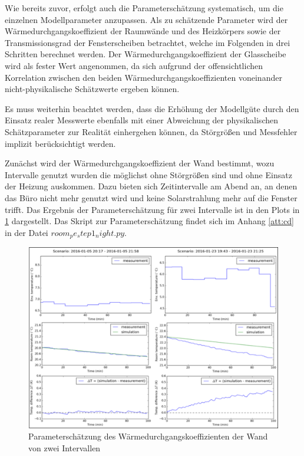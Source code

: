 Wie bereits zuvor, erfolgt auch die Parameterschätzung systematisch, um die einzelnen Modellparameter anzupassen. Als zu schätzende Parameter wird der Wärmedurchgangskoeffizient der Raumwände und des Heizkörpers sowie der Transmissionsgrad der Fensterscheiben betrachtet, welche im Folgenden in drei Schritten berechnet werden. Der Wärmedurchgangskoeffizient der Glasscheibe wird als fester Wert angenommen, da sich aufgrund der offensichtlichen Korrelation zwischen den beiden Wärmedurchgangskoeffizienten voneinander nicht-physikalische Schätzwerte ergeben können.

Es muss weiterhin beachtet werden, dass die Erhöhung der Modellgüte durch den Einsatz realer Messwerte ebenfalls mit einer Abweichung der physikalischen Schätzparameter zur Realität einhergehen können, da Störgrößen und Messfehler implizit berücksichtigt werden.

Zunächst wird der Wärmedurchgangskoeffizient der Wand bestimmt, wozu Intervalle genutzt wurden die möglichst ohne Störgrößen sind und ohne Einsatz der Heizung auskommen. Dazu bieten sich Zeitintervalle am Abend an, an denen das Büro nicht mehr genutzt wird und keine Solarstrahlung mehr auf die Fenster trifft. Das Ergebnis der Parameterschätzung für zwei Intervalle ist in den Plots in \ref{fig:step1} dargestellt. Das Skript zur Parameterschätzung findet sich im Anhang \ref{att:cd} in der Datei $room_pe_step1_night.py$.

\begin{figure}
\centering
\includegraphics[width=\textwidth]{abbildungen/20160329_pestep1}
\caption{Parameterschätzung des Wärmedurchgangskoeffizienten der Wand von zwei Intervallen}
\label{fig:step1}
\end{figure}

